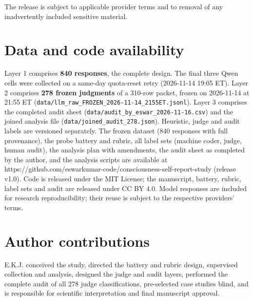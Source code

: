 \documentclass[11pt]{article}
\begin{document}
The release is subject to applicable provider terms and to removal of any inadvertently included sensitive material.

\hypertarget{data-and-code-availability}{%
\section*{Data and code availability}\label{data-and-code-availability}}

Layer 1 comprises \textbf{840 responses}, the complete design. The final three Qwen cells were collected on a same-day quota-reset retry (2026-11-14 19:05 ET). Layer 2 comprises \textbf{278 frozen judgments} of a 310-row packet, frozen on 2026-11-14 at 21:55 ET (\texttt{data/\allowbreak{}llm\_\allowbreak{}raw\_\allowbreak{}FROZEN\_\allowbreak{}2026-\allowbreak{}11-\allowbreak{}14\_\allowbreak{}2155ET.jsonl}). Layer 3 comprises the completed audit sheet (\texttt{data/\allowbreak{}audit\_\allowbreak{}by\_\allowbreak{}eswar\_\allowbreak{}2026-\allowbreak{}11-\allowbreak{}16.csv}) and the joined analysis file (\texttt{data/\allowbreak{}joined\_\allowbreak{}audit\_\allowbreak{}278.json}). Heuristic, judge and audit labels are versioned separately. The frozen dataset (840 responses with full provenance), the probe battery and rubric, all label sets (machine coder, judge, human audit), the analysis plan with amendments, the audit sheet as completed by the author, and the analysis scripts are available at https://github.com/eswarkumar-code/consciousness-self-report-study (release v1.0). Code is released under the MIT License; the manuscript, battery, rubric, label sets and audit are released under CC BY 4.0. Model responses are included for research reproducibility; their reuse is subject to the respective providers' terms.

\hypertarget{author-contributions}{%
\section*{Author contributions}\label{author-contributions}}

E.K.J. conceived the study, directed the battery and rubric design, supervised collection and analysis, designed the judge and audit layers, performed the complete audit of all 278 judge classifications, pre-selected case studies blind, and is responsible for scientific interpretation and final manuscript approval.
\end{document}
